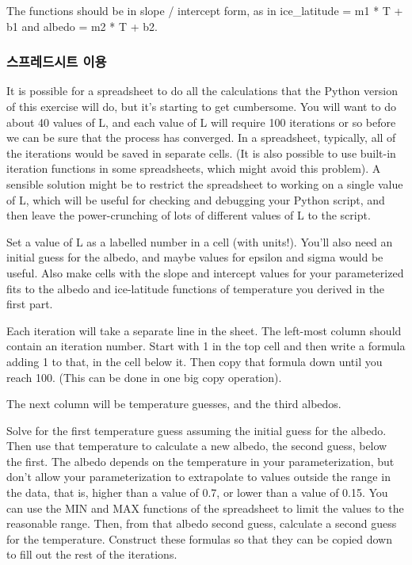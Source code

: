 The functions should be in slope / intercept form, as in ice_latitude = m1 * T + b1 and albedo = m2 * T + b2.

\subsubsection{스프레드시트 이용}\index{}
It is possible for a spreadsheet to do all the calculations that the Python version of this exercise will do, but it's starting to get cumbersome. You will want to do about 40 values of L, and each value of L will require 100 iterations or so before we can be sure that the process has converged. In a spreadsheet, typically, all of the iterations would be saved in separate cells. (It is also possible to use built-in iteration functions in some spreadsheets, which might avoid this problem). A sensible solution might be to restrict the spreadsheet to working on a single value of L, which will be useful for checking and debugging your Python script, and then leave the power-crunching of lots of different values of L to the script.

Set a value of L as a labelled number in a cell (with units!). You'll also need an initial guess for the albedo, and maybe values for epsilon and sigma would be useful. Also make cells with the slope and intercept values for your parameterized fits to the albedo and ice-latitude functions of temperature you derived in the first part.

Each iteration will take a separate line in the sheet. The left-most column should contain an iteration number. Start with 1 in the top cell and then write a formula adding 1 to that, in the cell below it. Then copy that formula down until you reach 100. (This can be done in one big copy operation).

The next column will be temperature guesses, and the third albedos.

Solve for the first temperature guess assuming the initial guess for the albedo. Then use that temperature to calculate a new albedo, the second guess, below the first. The albedo depends on the temperature in your parameterization, but don’t allow your parameterization to extrapolate to values outside the range in the data, that is, higher than a value of 0.7, or lower than a value of 0.15. You can use the MIN and MAX functions of the spreadsheet to limit the values to the reasonable range. Then, from that albedo second guess, calculate a second guess for the temperature. Construct these formulas so that they can be copied down to fill out the rest of the iterations.

